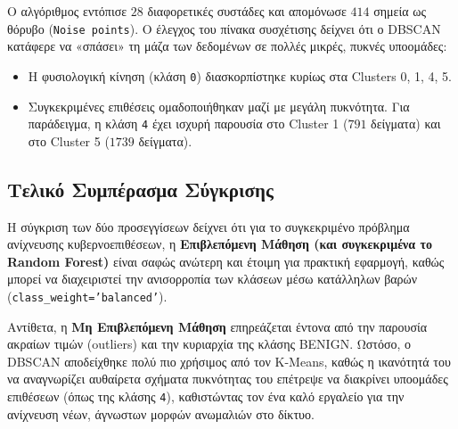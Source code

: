 \documentclass[11pt,a4paper]{article}
\begin{document}
	Ο αλγόριθμος εντόπισε $28$ διαφορετικές συστάδες και απομόνωσε $414$ σημεία ως θόρυβο (\texttt{Noise points}). Ο έλεγχος του πίνακα συσχέτισης δείχνει ότι ο DBSCAN κατάφερε να «σπάσει» τη μάζα των δεδομένων σε πολλές μικρές, πυκνές υποομάδες:
	\begin{itemize}
		\item Η φυσιολογική κίνηση (κλάση \texttt{0}) διασκορπίστηκε κυρίως στα Clusters 0, 1, 4, 5.
		\item Συγκεκριμένες επιθέσεις ομαδοποιήθηκαν μαζί με μεγάλη πυκνότητα. Για παράδειγμα, η κλάση \texttt{4} έχει ισχυρή παρουσία στο Cluster 1 ($791$ δείγματα) και στο Cluster 5 ($1739$ δείγματα).
	\end{itemize}
	
	\subsection{Τελικό Συμπέρασμα Σύγκρισης}
	Η σύγκριση των δύο προσεγγίσεων δείχνει ότι για το συγκεκριμένο πρόβλημα ανίχνευσης κυβερνοεπιθέσεων, η \textbf{Επιβλεπόμενη Μάθηση (και συγκεκριμένα το Random Forest)} είναι σαφώς ανώτερη και έτοιμη για πρακτική εφαρμογή, καθώς μπορεί να διαχειριστεί την ανισορροπία των κλάσεων μέσω κατάλληλων βαρών (\texttt{class\_weight='balanced'}). 
	
	Αντίθετα, η \textbf{Μη Επιβλεπόμενη Μάθηση} επηρεάζεται έντονα από την παρουσία ακραίων τιμών (outliers) και την κυριαρχία της κλάσης BENIGN. Ωστόσο, ο DBSCAN αποδείχθηκε πολύ πιο χρήσιμος από τον K-Means, καθώς η ικανότητά του να αναγνωρίζει αυθαίρετα σχήματα πυκνότητας του επέτρεψε να διακρίνει υποομάδες επιθέσεων (όπως της κλάσης \texttt{4}), καθιστώντας τον ένα καλό εργαλείο για την ανίχνευση νέων, άγνωστων μορφών ανωμαλιών στο δίκτυο.
\end{document}
